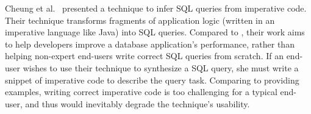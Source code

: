 Cheung et al.~\cite{abs-1208-2013} presented a technique to infer SQL
queries from imperative code. Their technique transforms
fragments of application logic (written in an imperative language
like Java) into SQL queries. 
Compared to \ourtool, their work aims to help developers
improve a database application's performance,
rather than helping non-expert end-users
write correct SQL queries from scratch. 
If an end-user wishes to use their technique to 
synthesize a SQL query, she must write a snippet of
imperative code to describe the query task.
Comparing to providing examples,
writing correct imperative code is too challenging
for a typical end-user, and thus would
inevitably degrade the technique's usability.


